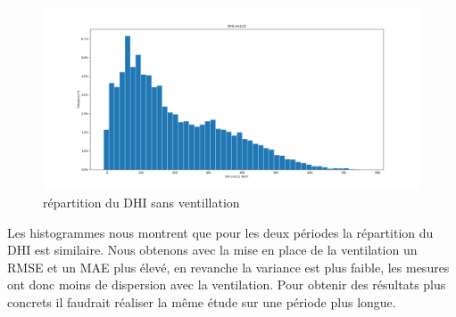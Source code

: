 \documentclass[12pt,a4paper]{article}
\begin{document}
\begin{flushleft}
\begin{figure}[H]
\centering
\includegraphics[width=15cm]{image/impact_ventillation/archive_2021-03-11_2021-04-20/histogramme_3.png} 
\caption{répartition du DHI sans ventillation}  
\end{figure}

Les histogrammes nous montrent que pour les deux périodes la répartition du DHI est similaire.
Nous obtenons avec la mise en place de la ventilation un RMSE et un MAE plus élevé, en revanche la variance est plus faible, les mesures ont donc moins de dispersion avec la ventilation. Pour obtenir des résultats plus concrets il faudrait réaliser la même étude sur une période plus longue.




\end{flushleft}






\end{document}
